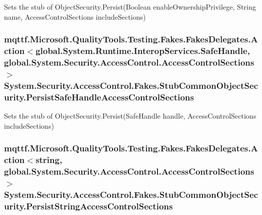 Sets the stub of Object\-Security.\-Persist(\-Boolean enable\-Ownership\-Privilege, String name, Access\-Control\-Sections include\-Sections)

\hypertarget{class_system_1_1_security_1_1_access_control_1_1_fakes_1_1_stub_common_object_security_a9bfcacbeb33c6c454782699bc72febac}{
\subsubsection[{Persist\-Safe\-Handle\-Access\-Control\-Sections}]{\setlength{\rightskip}{0pt plus 5cm}mqttf.\-Microsoft.\-Quality\-Tools.\-Testing.\-Fakes.\-Fakes\-Delegates.\-Action$<$global.\-System.\-Runtime.\-Interop\-Services.\-Safe\-Handle, global.\-System.\-Security.\-Access\-Control.\-Access\-Control\-Sections$>$ System.\-Security.\-Access\-Control.\-Fakes.\-Stub\-Common\-Object\-Security.\-Persist\-Safe\-Handle\-Access\-Control\-Sections}}\label{class_system_1_1_security_1_1_access_control_1_1_fakes_1_1_stub_common_object_security_a9bfcacbeb33c6c454782699bc72febac}


Sets the stub of Object\-Security.\-Persist(\-Safe\-Handle handle, Access\-Control\-Sections include\-Sections)

\hypertarget{class_system_1_1_security_1_1_access_control_1_1_fakes_1_1_stub_common_object_security_a34094fbefdb65cbb9e7700699bd62d3e}{
\subsubsection[{Persist\-String\-Access\-Control\-Sections}]{\setlength{\rightskip}{0pt plus 5cm}mqttf.\-Microsoft.\-Quality\-Tools.\-Testing.\-Fakes.\-Fakes\-Delegates.\-Action$<$string, global.\-System.\-Security.\-Access\-Control.\-Access\-Control\-Sections$>$ System.\-Security.\-Access\-Control.\-Fakes.\-Stub\-Common\-Object\-Security.\-Persist\-String\-Access\-Control\-Sections}}\label{class_system_1_1_security_1_1_access_control_1_1_fakes_1_1_stub_common_object_security_a34094fbefdb65cbb9e7700699bd62d3e}


